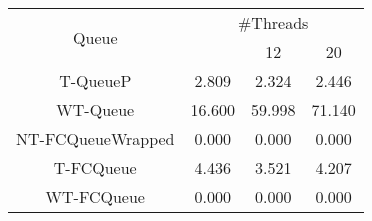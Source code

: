 \begin{tabular}{|c|c|c|c|}
\hline
\multirow{2}{*}{Queue} & \multicolumn{3}{c|}{\#Threads}\\\cline{2-4}& \quad 4 & 12 & 20\\
\hline
\hline
T-QueueP & 2.809 & 2.324 & 2.446\\
WT-Queue & 16.600 & 59.998 & 71.140\\
NT-FCQueueWrapped & 0.000 & 0.000 & 0.000\\
T-FCQueue & 4.436 & 3.521 & 4.207\\
WT-FCQueue & 0.000 & 0.000 & 0.000\\
\hline\end{tabular}

